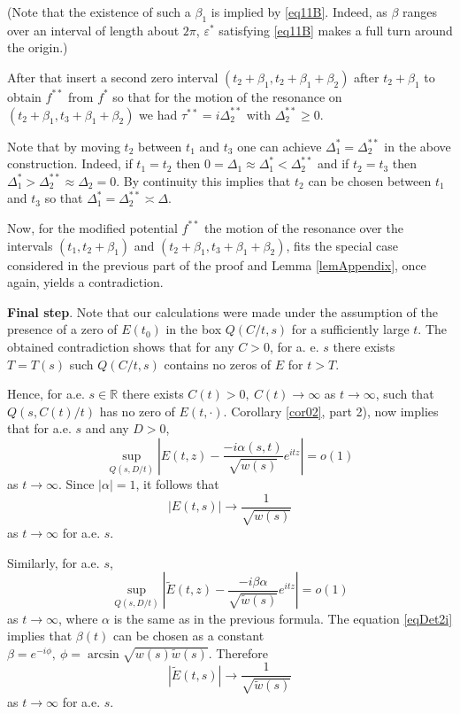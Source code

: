 \documentclass[11pt,twoside,reqno]{amsart}
\def\ti{\tilde}
\def\to{\rightarrow}
\def\R{{\mathbb R}}
\def\DD{{\mathcal{D}}}
\def\e{\varepsilon}
\def\DD{\Delta}
\def\a{\alpha}
\def\b{\beta}
\theoremstyle{plain}
\numberwithin{equation}{section}
\begin{document}
(Note that the existence of such a $\b_1$ is implied by \eqref{eq11B}. Indeed, as $\b$ ranges over an interval of length about $2\pi$,
$\e^*$ satisfying \eqref{eq11B} makes a full turn around the origin.)

After that insert a second zero interval $(t_2+\b_1, t_2+\b_1+\b_2)$ after $t_2+\b_1$ to obtain $f^{**}$ from $f^*$ so that 
for the motion of the resonance on $(t_2+\b_1, t_3+\b_1+\b_2)$ we had $\tau^{**}=i\DD_2^{**}$
 with $\DD_2^{**}\geq 0$. 

Note that by moving $t_2$ between $t_1$ and $t_3$ one can achieve $\DD^*_1=\DD^{**}_2$ in the above construction. Indeed,
if $t_1=t_2$ then $0=\DD_1\approx \DD^*_1<\DD^{**}_2$ and if $t_2=t_3$ then
$\DD_1^*>\DD_2^{**}\approx \DD_2=0$. By continuity this implies that $t_2$ can be chosen between $t_1$ and $t_3$ so that
$\DD^*_1=\DD^{**}_2\asymp \DD$. 

Now, for the modified potential $f^{**}$ the motion of the resonance over the intervals $(t_1, t_2+\b_1)$ and $(t_2+\b_1,t_3+\b_1+\b_2)$, fits the special case considered in the previous part of the proof and Lemma \ref{lemAppendix}, once again, yields a 
contradiction.






{\bf Final step}. Note that our calculations were made under the assumption of the presence of a zero of $E(t_0)$ in the box $Q(C/t, s)$ for a sufficiently large $t$. The obtained contradiction shows that for any $C>0$, for  a. e. $s$  there exists $T=T(s)$ such $Q(C/t, s)$ contains no zeros of $E$ for $t>T$.


Hence, for a.e. $s\in \R$ there exists $C(t)>0,\ C(t)\to\infty$ as $t\to\infty$, such that
$Q(s,C(t)/t)$ has no zero of $E(t,\cdot)$. Corollary \ref{cor02}, part 2), now implies that
for a.e. $s$ and any $D>0$,
\begin{equation}\sup_{Q(s,D/t)}\left|E(t,z)-\frac {-i\a(s,t)}{\sqrt{ w(s)}}e^{itz}\right|=o(1)\label{eq990}\end{equation}
as $t\to\infty$. Since $|\a|=1$, it follows that
$$|E(t,s)|\to \frac 1{\sqrt{w(s)}}$$
as $t\to\infty$ for a.e. $s$.

Similarly, for a.e. $s$,
\begin{equation}\sup_{Q(s,D/t)}\left|\ti E(t,z)-\frac {-i\b\a}{\sqrt{\ti w(s)}}e^{itz}\right|=o(1)\label{eq991}\end{equation}
as $t\to\infty$, where $\a$ is the same as in the previous formula.
The equation \eqref{eqDet2i} implies that $\beta(t)$ can be chosen as a constant
 $\b=e^{-i\phi},\ \phi=\arcsin \sqrt{w(s)\ti w(s)}$.
Therefore
$$|\ti E(t,s)|\to \frac 1{\sqrt{\ti w(s)}}$$
as $t\to\infty$ for a.e. $s$.
\end{document}
